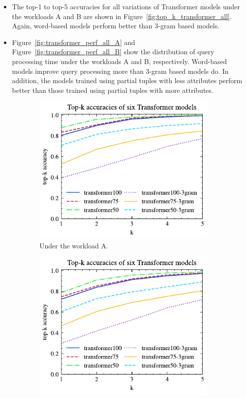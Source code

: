 \documentclass[conference]{IEEEtran}
\begin{document}
\begin{itemize}
	\item The top-1 to top-5 accuracies for all variations of Transformer models under the workloads A and B are shown in Figure~\ref{fig:top_k_transformer_all}. 
	Again, word-based models perform better than 3-gram based models. 
	\item Figure~\ref{fig:transformer_perf_all_A} and Figure~\ref{fig:transformer_perf_all_B} show the distribution of query processing time under the workloads A and B, respectively.
	Word-based models improve query processing more than 3-gram based models do.
	In addition, the models trained using partial tuples with less attributes perform better than those trained using partial tuples with more attributes.
\end{itemize}
\begin{figure}[!th]
	\centering
	\begin{subfigure}{0.45\textwidth}
		\centering
		\includegraphics[]{graphics/top_k_transformer_A.pdf}
		\caption{Under the workload A.}
		\label{fig:top_k_transformer_A}
	\end{subfigure}
	\hfill
	\begin{subfigure}{0.45\textwidth}
		\centering
		\includegraphics[]{graphics/top_k_transformer_B.pdf}

\end{subfigure}
\end{figure}
\end{document}

